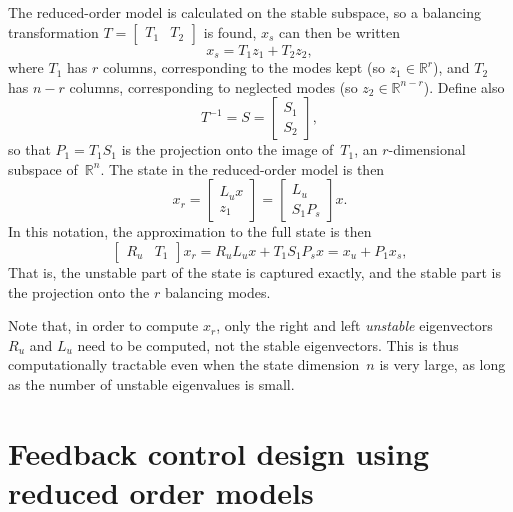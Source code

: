 \documentclass[12pt,lot, lof]{puthesis}
\newcommand{\R}{\mathbb{R}}
\begin{document}
The reduced-order model is calculated on the stable subspace, so a
balancing transformation $T =
\begin{bmatrix}
  T_1 & T_2
\end{bmatrix}$ is found, $x_s$ can then be written
\begin{equation}
  \label{eq:6}
  x_s = T_1 z_1 + T_2 z_2,
\end{equation}
where $T_1$ has $r$ columns, corresponding to the modes kept (so
$z_1\in \R^r$), and $T_2$ has $n-r$ columns, corresponding to neglected modes (so
$z_2\in \R^{n-r}$).  Define also
\begin{equation}
  \label{eq:4}
  T^{-1} = S =
  \begin{bmatrix}
    S_1 \\ S_2
  \end{bmatrix},
\end{equation}
so that $P_1=T_1S_1$ is the projection onto the image of~$T_1$, an
$r$-dimensional subspace of~$\R^n$.
%
The state in the reduced-order model is then
\begin{equation}
  \label{eq:5}
  x_r =
  \begin{bmatrix}
    L_u x \\ z_1
  \end{bmatrix}
  =
  \begin{bmatrix}
   L_u\\
   S_1 P_s
  \end{bmatrix}
  x.
\end{equation}
In this notation, the approximation to the full state is then
\begin{equation}
  \label{eq:7}
  \begin{bmatrix}
    R_u & T_1
  \end{bmatrix}
  x_r = R_u L_u x + T_1 S_1 P_s x = x_u + P_1 x_s,
\end{equation}
That is, the unstable part of the state is captured exactly, and the stable part
is the projection onto the $r$ balancing modes.

Note that, in order to compute $x_r$, only the right and left
{\em unstable} eigenvectors $R_u$ and $L_u$ need to be computed, not the stable eigenvectors.  This is thus computationally tractable even when the state dimension~$n$ is very
large, as long as the number of unstable eigenvalues is small.


 
\section{Feedback control design using reduced order models}
\label{Control}
\end{document}
